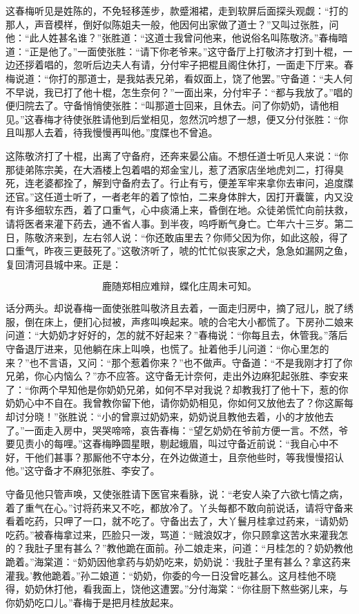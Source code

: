 这春梅听见是姓陈的，不免轻移莲步，款蹙湘裙，走到软屏后面探头观觑：“打的那人，声音模样，倒好似陈姐夫一般，他因何出家做了道士？”又叫过张胜，问他：“此人姓甚名谁？”张胜道：“这道士我曾问他来，他说俗名叫陈敬济。”春梅暗道：“正是他了。”一面使张胜：“请下你老爷来。”这守备厅上打敬济才打到十棍，一边还拶着唱的，忽听后边夫人有请，分付牢子把棍且阁住休打，一面走下厅来。春梅说道：“你打的那道士，是我姑表兄弟，看奴面上，饶了他罢。”守备道：“夫人何不早说，我已打了他十棍，怎生奈何？”一面出来，分付牢子：“都与我放了。”唱的便归院去了。守备悄悄使张胜：“叫那道士回来，且休去。问了你奶奶，请他相见。”这春梅才待使张胜请他到后堂相见，忽然沉吟想了一想，便又分付张胜：“你且叫那人去着，待我慢慢再叫他。”度牒也不曾追。

这陈敬济打了十棍，出离了守备府，还奔来晏公庙。不想任道士听见人来说：“你那徒弟陈宗美，在大酒楼上包着唱的郑金宝儿，惹了洒家店坐地虎刘二，打得臭死，连老婆都拴了，解到守备府去了。行止有亏，便差军牢来拿你去审问，追度牒还官。”这任道士听了，一者老年的着了惊怕，二来身体胖大，因打开囊箧，内又没有许多细软东西，着了口重气，心中痰涌上来，昏倒在地。众徒弟慌忙向前扶救，请将医者来灌下药去，通不省人事。到半夜，呜呼断气身亡。亡年六十三岁。第二日，陈敬济来到，左右邻人说：“你还敢庙里去？你师父因为你，如此这般，得了口重气，昨夜三更鼓死了。”这敬济听了，唬的忙忙似丧家之犬，急急如漏网之鱼，复回清河县城中来。正是：

\[
鹿随郑相应难辩，蝶化庄周未可知。
\]

话分两头。却说春梅一面使张胜叫敬济且去着，一面走归房中，摘了冠儿，脱了绣服，倒在床上，便扪心挝被，声疼叫唤起来。唬的合宅大小都慌了。下房孙二娘来问道：“大奶奶才好好的，怎的就不好起来？”春梅说：“你每且去，休管我。”落后守备退厅进来，见他躺在床上叫唤，也慌了。扯着他手儿问道：“你心里怎的来？”也不言语，又问：“那个惹着你来？”也不做声。守备道：“不是我刚才打了你兄弟，你心内恼么？”亦不应答。这守备无计奈何，走出外边麻犯起张胜、李安来了：“你两个早知他是你奶奶兄弟，如何不早对我说？却教我打了他十下，惹的你奶奶心中不自在。我曾教你留下他，请你奶奶相见，你如何又放他去了？你这厮每却讨分晓！”张胜说：“小的曾禀过奶奶来，奶奶说且教他去着，小的才放他去了。”一面走入房中，哭哭啼啼，哀告春梅：“望乞奶奶在爷前方便一言。不然，爷要见责小的每哩。”这春梅睁圆星眼，剔起蛾眉，叫过守备近前说：“我自心中不好，干他们甚事？那厮他不守本分，在外边做道士，且奈他些时，等我慢慢招认他。”这守备才不麻犯张胜、李安了。

守备见他只管声唤，又使张胜请下医官来看脉，说：“老安人染了六欲七情之病，着了重气在心。”讨将药来又不吃，都放冷了。丫头每都不敢向前说话，请将守备来看着吃药，只呷了一口，就不吃了。守备出去了，大丫鬟月桂拿过药来，“请奶奶吃药。”被春梅拿过来，匹脸只一泼，骂道：“贼浪奴才，你只顾拿这苦水来灌我怎的？我肚子里有甚么？”教他跪在面前。孙二娘走来，问道：“月桂怎的？奶奶教他跪着。”海棠道：“奶奶因他拿药与奶奶吃来，奶奶说：‘我肚子里有甚么？拿这药来灌我。’教他跪着。”孙二娘道：“奶奶，你委的今一日没曾吃甚么。这月桂他不晓得，奶奶休打他，看我面上，饶他这遭罢。”分付海棠：“你往厨下熬些粥儿来，与你奶奶吃口儿。”春梅于是把月桂放起来。

